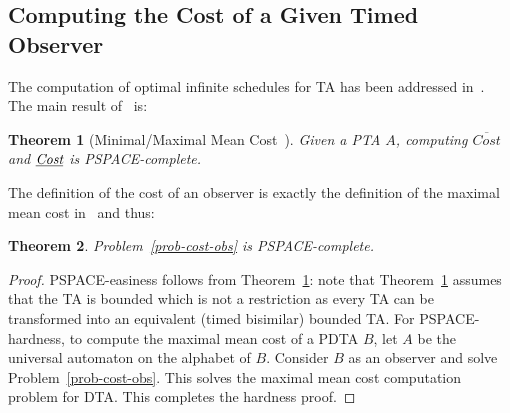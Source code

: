 \documentclass[letterpaper,10pt,conference]{ieeeconf}  \IEEEoverridecommandlockouts                              \overrideIEEEmargins
\newtheorem{theorem}{Theorem}
\def\Cost{\textit{Cost}}
\def\MeanCost{\textit{$\overline{\Cost}$}}
\begin{document}
\subsection{Computing the Cost of a Given Timed Observer}
The computation of optimal infinite schedules for TA has been
addressed in~\cite{BBL-fmsd06}.  The main result of~\cite{BBL-fmsd06}  is:
\begin{theorem}[Minimal/Maximal Mean
  Cost~\cite{BBL-fmsd06}]\label{thm-pat}
  Given a PTA $A$, com\-puting $\MeanCost$ and $\underline{\textit{Cost}}$ is
  PSPACE-complete.
\end{theorem}
The definition of the cost of an observer is exactly the defi\-ni\-tion
of the maximal mean cost in~\cite{BBL-fmsd06} and thus:
\begin{theorem}
  Problem~\ref{prob-cost-obs} is PSPACE-complete.
\end{theorem}
\begin{proof}
  PSPACE-easiness follows from Theorem~\ref{thm-pat}: note that
  Theorem~\ref{thm-pat} assumes that the TA is bounded which is not a
  restriction as every TA can be transformed into an equivalent (timed
  bisimilar) bounded TA. For PSPACE-hardness, to compute the maximal
  mean cost of a PDTA $B$, let $A$ be the universal automaton on the
  alphabet of $B$.  Consider $B$ as an observer and solve
  Problem~\ref{prob-cost-obs}.  This solves the maximal mean cost
  computation problem for DTA.  This completes the hardness proof.
\end{proof}
\end{document}
